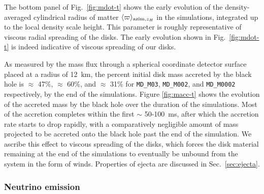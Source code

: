 The bottom panel of Fig.~\ref{fig:mdot-t} shows the early evolution of the density-averaged cylindrical radius of matter $\langle \varpi \rangle_{{\rm azim}, z_H}$ in the simulations, integrated up to the local density scale height. This parameter is roughly representative of viscous radial spreading of the disks. The early evolution shown in Fig.~\ref{fig:mdot-t} is indeed indicative of viscous spreading of our disks.

As measured by the mass flux through a spherical coordinate detector surface placed at a radius of 12~km, the percent initial disk mass accreted by the black hole is $\approx$ 47\%, $\approx$ 60\%, and $\approx$ 31\% for \texttt{MD\_M03}, \texttt{MD\_M002}, and \texttt{MD\_M0002} respectively, by the end of the simulations. Figure \ref{fig:macc-t} shows the evolution of the accreted mass by the black hole over the duration of the simulations. Most of the accretion completes within the first $\sim$ 50-100~ms, after which the accretion rate starts to drop rapidly, with a comparatively negligible amount of mass projected to be accreted onto the black hole past the end of the simulation. We ascribe this effect to viscous spreading of the disks, which forces the disk material remaining at the end of the simulations to eventually be unbound from the system in the form of winds. Properties of ejecta are discussed in Sec.~\ref{sec:ejecta}.



\subsubsection{Neutrino emission}
\label{sec:neutrino_emission}

